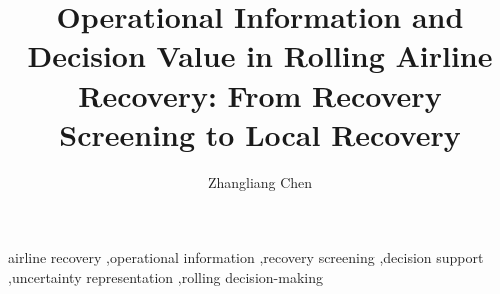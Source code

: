 \documentclass[a4paper,fleqn]{cas-sc}
\begin{document}
\let\WriteBookmarks\relax
\def\floatpagepagefraction{1}
\def\textpagefraction{.001}


\title[mode=title]{Operational Information and Decision Value in Rolling Airline Recovery: From Recovery Screening to Local Recovery}

\author[1]{Zhangliang Chen}



\begin{keywords}
 airline recovery
 \sep operational information
 \sep recovery screening
 \sep decision support
 \sep uncertainty representation
 \sep rolling decision-making
\end{keywords}

\maketitle











\end{document}
